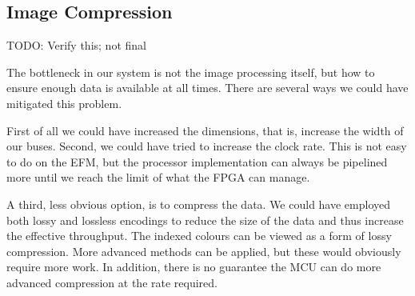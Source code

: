 \subsection{Image Compression}
TODO: Verify this; not final

The bottleneck in our system is not the image processing itself, but how to ensure enough data is available at all times.
There are several ways we could have mitigated this problem.

First of all we could have increased the dimensions, that is, increase the width of our buses. Second, we could have tried to increase the clock rate. This is not easy to do on the EFM, but the processor implementation can always be pipelined more until we reach the limit of what the FPGA can manage.

A third, less obvious option, is to compress the data. We could have employed both lossy and lossless encodings to reduce the size of the data and thus increase the effective throughput. The indexed colours can be viewed as a form of lossy compression.
More advanced methods can be applied, but these would obviously require more work.
In addition, there is no guarantee the MCU can do more advanced compression at the rate required.
